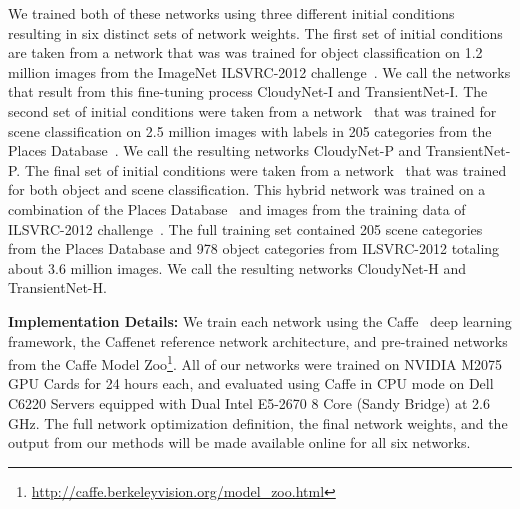 \documentclass[10pt,twocolumn,letterpaper]{article}
\newcommand{\todo}[1]{\textcolor{red}{todo: {\em #1}}}
\begin{document}
We trained both of these networks using three different initial conditions
resulting in six distinct sets of network weights. The first set of initial
conditions are taken from a network that was was trained for object
classification on 1.2 million images from the ImageNet ILSVRC-2012
challenge~\cite{ILSVRCarxiv14}.  We call the networks that result from this
fine-tuning process CloudyNet-I and TransientNet-I.  The second set of initial
conditions were taken from a network~\cite{zhou2014places} that was trained for
scene classification on 2.5 million images with labels in 205 categories from
the Places Database~\cite{zhou2014places}. We call the resulting networks
CloudyNet-P and TransientNet-P.  The final set of initial conditions were taken
from a network~\cite{zhou2014places} that was trained for both object and scene
classification.  This hybrid network was trained on a combination of the Places
Database~\cite{zhou2014places} and images from the training data of ILSVRC-2012
challenge~\cite{ILSVRCarxiv14}.  The full training set contained 205 scene
categories from the Places Database and 978 object categories from ILSVRC-2012
totaling about 3.6 million images.  We call the resulting networks CloudyNet-H
and TransientNet-H.

%

\textbf{Implementation Details:} We train each network using the
Caffe~\cite{caffe14} deep learning framework, the Caffenet reference network
architecture, and pre-trained networks from the Caffe Model
Zoo\footnote{\url{http://caffe.berkeleyvision.org/model_zoo.html}}.  All of our
networks were trained on NVIDIA M2075 GPU Cards for 24 hours each, and
evaluated using Caffe in CPU mode on Dell C6220 Servers equipped with Dual
Intel E5-2670 8 Core (Sandy Bridge) at 2.6 GHz.  The full network optimization
definition, the final network weights, and the output from our methods will be
made available online for all six networks.
\end{document}
